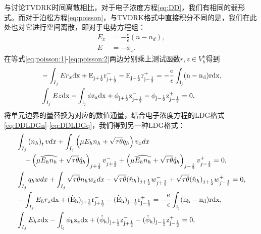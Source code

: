 与讨论TVDRK时间离散相比，对于电子浓度方程\eqref{eq:DD}，我们有相同的弱形式。而对于泊松方程\eqref{eq:poisson}，与TVDRK格式中直接积分不同的是，我们在此处也对它进行空间离散，即对于电势方程组：
\begin{align}
    E_x & = -\frac{e}{\epsilon}(n-n_d), \label{eq:poisson:1} \\
    E   & = - \phi_x. \label{eq:poisson:2}
\end{align}
在等式\eqref{eq:poisson:1}-\eqref{eq:poisson:2}两边分别乘上测试函数$r,z\in V^k_h$得到
\begin{align}
     & -\int_{I_j}Er_x\rm{d}x + E_{j+\frac{1}{2}}r_{j+\frac{1}{2}}^- - E_{j-\frac{1}{2}}r_{j-\frac{1}{2}}^+ = -\frac{e}{\epsilon}\int_{I_j}(n-n_d)r\rm{d}x,                                       \label{DD:weakform:E} \\
     & \int_{I_j} Ez \rm{d}x - \int_{I_j}\phi z_x \rm{d}x + \phi_{j+\frac{1}{2}}z_{j+\frac{1}{2}}^- - \phi_{j-\frac{1}{2}}z_{j-\frac{1}{2}}^+ = 0, \label{DD:weakform:phi}
\end{align}
将单元边界的量替换为对应的数值通量，结合电子浓度方程的LDG格式\eqref{eq:DDLDGn}-\eqref{eq:DDLDGq}，我们得到另一种LDG格式：
\begin{align}
     & \int_{I_{j}}\left(n_h\right)_{t} v d x+\int_{I_{j}}\left(\mu E_h n_h+\sqrt{\tau \theta} q_h\right) v_{x} d x      \nonumber                                                                                                                       \\
     & \quad-\left(\mu \widehat{E_h n_h}+\sqrt{\tau \theta} \hat{q}_{h}\right)_{j+\frac{1}{2}} v_{j+\frac{1}{2}}^{-}+\left(\mu \widehat{E_h n_h}+\sqrt{\tau \theta} \hat{q}_{h}\right)_{j-\frac{1}{2}} v_{j-\frac{1}{2}}^{+}=0, \label{eq:IMEX:DD:n}     \\
     & \int_{I_{j}} q_h w d x+\int_{I_{j}} \sqrt{\tau \theta} n_h w_{x} d x-\sqrt{\tau \theta} (\hat{n}_h)_{j+\frac{1}{2}} w_{j+\frac{1}{2}}^{-}+\sqrt{\tau \theta} (\hat{n}_h)_{j+\frac{1}{2}} w_{j-\frac{1}{2}}^{+}=0,            \label{eq:IMEX:DD:q} \\
     & -\int_{I_j}E_hr_x\rm{d}x + (\hat{E}_h)_{j+\frac{1}{2}}r_{j+\frac{1}{2}}^- - (\hat{E}_h)_{j-\frac{1}{2}}r_{j-\frac{1}{2}}^+ = -\frac{e}{\epsilon}\int_{I_j}(n_h-n_d)r\rm{d}x,                                        \label{eq:IMEX:poisson:1}     \\
     & \int_{I_j} E_hz \rm{d}x - \int_{I_j}\phi_h z_x \rm{d}x + (\hat{\phi}_h)_{j+\frac{1}{2}}z_{j+\frac{1}{2}}^- - (\hat{\phi}_h)_{j-\frac{1}{2}}z_{j-\frac{1}{2}}^+ = 0,\label{eq:IMEX:poisson:2}
\end{align}

